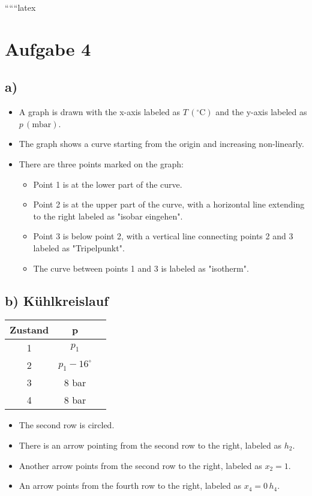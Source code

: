 
``````latex


\section*{Aufgabe 4}

\subsection*{a)}

\begin{itemize}
    \item A graph is drawn with the x-axis labeled as \( T \, (^\circ \text{C}) \) and the y-axis labeled as \( p \, (\text{mbar}) \).
    \item The graph shows a curve starting from the origin and increasing non-linearly.
    \item There are three points marked on the graph:
        \begin{itemize}
            \item Point 1 is at the lower part of the curve.
            \item Point 2 is at the upper part of the curve, with a horizontal line extending to the right labeled as "isobar eingehen".
            \item Point 3 is below point 2, with a vertical line connecting points 2 and 3 labeled as "Tripelpunkt".
            \item The curve between points 1 and 3 is labeled as "isotherm".
        \end{itemize}
\end{itemize}

\subsection*{b) Kühlkreislauf}

\begin{tabular}{|c|c|c|}
    \hline
    Zustand & p & \\
    \hline
    1 & $p_1$ & \\
    \hline
    2 & $p_1 - 16^\circ$ & \\
    \hline
    3 & 8 bar & \\
    \hline
    4 & 8 bar & \\
    \hline
\end{tabular}

\begin{itemize}
    \item The second row is circled.
    \item There is an arrow pointing from the second row to the right, labeled as \( h_2 \).
    \item Another arrow points from the second row to the right, labeled as \( x_2 = 1 \).
    \item An arrow points from the fourth row to the right, labeled as \( x_4 = 0 \, h_4 \).
\end{itemize}

